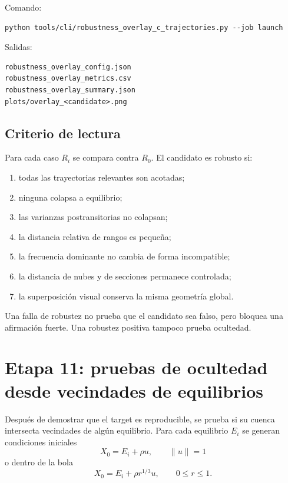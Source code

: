 \documentclass[11pt]{article}
\begin{document}
Comando:
\begin{lstlisting}
python tools/cli/robustness_overlay_c_trajectories.py --job launch
\end{lstlisting}

Salidas:
\begin{lstlisting}
robustness_overlay_config.json
robustness_overlay_metrics.csv
robustness_overlay_summary.json
plots/overlay_<candidate>.png
\end{lstlisting}

\subsection{Criterio de lectura}

Para cada caso \(R_i\) se compara contra \(R_0\). El candidato es robusto si:
\begin{enumerate}
\item todas las trayectorias relevantes son acotadas;
\item ninguna colapsa a equilibrio;
\item las varianzas postransitorias no colapsan;
\item la distancia relativa de rangos es pequeña;
\item la frecuencia dominante no cambia de forma incompatible;
\item la distancia de nubes y de secciones permanece controlada;
\item la superposición visual conserva la misma geometría global.
\end{enumerate}

Una falla de robustez no prueba que el candidato sea falso, pero bloquea una afirmación fuerte. Una robustez positiva tampoco prueba ocultedad.

\section{Etapa 11: pruebas de ocultedad desde vecindades de equilibrios}

Después de demostrar que el target es reproducible, se prueba si su cuenca intersecta vecindades de algún equilibrio. Para cada equilibrio \(E_i\) se generan condiciones iniciales
\begin{equation}
X_0=E_i+\rho u,
\qquad \|u\|=1
\end{equation}
o dentro de la bola
\begin{equation}
X_0=E_i+\rho r^{1/3}u,
\qquad 0\le r\le 1.
\end{equation}
\end{document}
